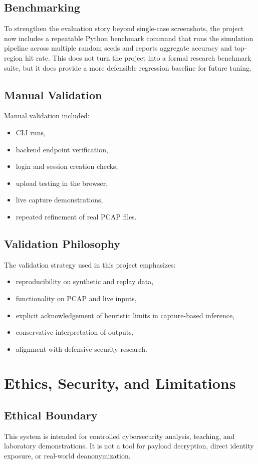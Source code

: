 \documentclass[12pt,a4paper]{report}
\begin{document}
\section{Benchmarking}
To strengthen the evaluation story beyond single-case screenshots, the project now includes a repeatable Python benchmark command that runs the simulation pipeline across multiple random seeds and reports aggregate accuracy and top-region hit rate. This does not turn the project into a formal research benchmark suite, but it does provide a more defensible regression baseline for future tuning.

\section{Manual Validation}
Manual validation included:
\begin{itemize}[leftmargin=1.5em]
    \item CLI runs,
    \item backend endpoint verification,
    \item login and session creation checks,
    \item upload testing in the browser,
    \item live capture demonstrations,
    \item repeated refinement of real PCAP files.
\end{itemize}

\section{Validation Philosophy}
The validation strategy used in this project emphasizes:
\begin{itemize}[leftmargin=1.5em]
    \item reproducibility on synthetic and replay data,
    \item functionality on PCAP and live inputs,
    \item explicit acknowledgement of heuristic limits in capture-based inference,
    \item conservative interpretation of outputs,
    \item alignment with defensive-security research.
\end{itemize}

\chapter{Ethics, Security, and Limitations}
\section{Ethical Boundary}
This system is intended for controlled cybersecurity analysis, teaching, and laboratory demonstrations. It is not a tool for payload decryption, direct identity exposure, or real-world deanonymization.
\end{document}
